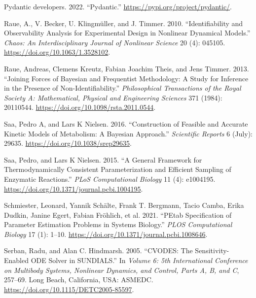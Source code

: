 \documentclass[
  letterpaper,
  DIV=11,
  numbers=noendperiod]{scrartcl}
\newlength{\cslhangindent}
\newlength{\cslentryspacingunit} %
\newenvironment{CSLReferences}[2] %
 {%
  \setlength{\parindent}{0pt}
  \ifodd #1
  \let\oldpar\par
  \def\par{\hangindent=\cslhangindent\oldpar}
  \fi
  \setlength{\parskip}{#2\cslentryspacingunit}
 }%
 {}
\begin{document}
\begin{CSLReferences}{1}{0}
\leavevmode{}%
Pydantic developers. 2022. {``Pydantic.''}
\url{https://pypi.org/project/pydantic/}.

\leavevmode{}%
Raue, A., V. Becker, U. Klingmüller, and J. Timmer. 2010.
{``Identifiability and Observability Analysis for Experimental Design in
Nonlinear Dynamical Models.''} \emph{Chaos: An Interdisciplinary Journal
of Nonlinear Science} 20 (4): 045105.
\url{https://doi.org/10.1063/1.3528102}.

\leavevmode{}%
Raue, Andreas, Clemens Kreutz, Fabian Joachim Theis, and Jens Timmer.
2013. {``Joining Forces of {Bayesian} and Frequentist Methodology: A
Study for Inference in the Presence of Non-Identifiability.''}
\emph{Philosophical Transactions of the Royal Society A: Mathematical,
Physical and Engineering Sciences} 371 (1984): 20110544.
\url{https://doi.org/10.1098/rsta.2011.0544}.

\leavevmode{}%
Saa, Pedro A, and Lars K Nielsen. 2016. {``Construction of Feasible and
Accurate Kinetic Models of Metabolism: {A} {Bayesian} Approach.''}
\emph{Scientific Reports} 6 (July): 29635.
\url{https://doi.org/10.1038/srep29635}.

\leavevmode{}%
Saa, Pedro, and Lars K Nielsen. 2015. {``A General Framework for
Thermodynamically Consistent Parameterization and Efficient Sampling of
Enzymatic Reactions.''} \emph{PLoS Computational Biology} 11 (4):
e1004195. \url{https://doi.org/10.1371/journal.pcbi.1004195}.

\leavevmode{}%
Schmiester, Leonard, Yannik Schälte, Frank T. Bergmann, Tacio Camba,
Erika Dudkin, Janine Egert, Fabian Fröhlich, et al. 2021.
{``{PEtab} Specification of Parameter
Estimation Problems in Systems Biology.''} \emph{PLOS Computational
Biology} 17 (1): 1--10.
\url{https://doi.org/10.1371/journal.pcbi.1008646}.

\leavevmode{}%
Serban, Radu, and Alan C. Hindmarsh. 2005. {``{CVODES}: {The
Sensitivity-Enabled ODE Solver} in {SUNDIALS}.''} In \emph{Volume 6: 5th
{International Conference} on {Multibody Systems}, {Nonlinear Dynamics},
and {Control}, {Parts A}, {B}, and {C}}, 257--69. {Long Beach,
California, USA}: {ASMEDC}.
\url{https://doi.org/10.1115/DETC2005-85597}.


\end{CSLReferences}
\end{document}
